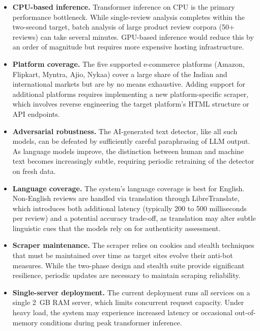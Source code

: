\documentclass[12pt,a4paper,oneside]{report}
\begin{document}
\begin{itemize}[leftmargin=*]
  \item \textbf{CPU-based inference.} Transformer inference on CPU is
        the primary performance bottleneck. While single-review analysis
        completes within the two-second target, batch analysis of large
        product review corpora (50+ reviews) can take several minutes.
        GPU-based inference would reduce this by an order of magnitude
        but requires more expensive hosting infrastructure.
  \item \textbf{Platform coverage.} The five supported e-commerce
        platforms (Amazon, Flipkart, Myntra, Ajio, Nykaa) cover a large
        share of the Indian and international markets but are by no means
        exhaustive. Adding support for additional platforms requires
        implementing a new platform-specific scraper, which involves
        reverse engineering the target platform's HTML structure or API
        endpoints.
  \item \textbf{Adversarial robustness.} The AI-generated text detector,
        like all such models, can be defeated by sufficiently careful
        paraphrasing of LLM output. As language models improve, the
        distinction between human and machine text becomes increasingly
        subtle, requiring periodic retraining of the detector on fresh
        data.
  \item \textbf{Language coverage.} The system's language coverage is
        best for English. Non-English reviews are handled via translation
        through LibreTranslate, which introduces both additional latency
        (typically 200 to 500 milliseconds per review) and a potential
        accuracy trade-off, as translation may alter subtle linguistic
        cues that the models rely on for authenticity assessment.
  \item \textbf{Scraper maintenance.} The scraper relies on cookies and
        stealth techniques that must be maintained over time as target
        sites evolve their anti-bot measures. While the two-phase design
        and stealth suite provide significant resilience, periodic updates
        are necessary to maintain scraping reliability.
  \item \textbf{Single-server deployment.} The current deployment runs all
        services on a single 2~GB RAM server, which limits concurrent
        request capacity. Under heavy load, the system may experience
        increased latency or occasional out-of-memory conditions during
        peak transformer inference.
\end{itemize}
\end{document}
